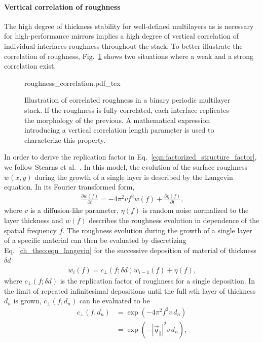 \paragraph{Vertical correlation of roughness}
The high degree of thickness stability for well-defined multilayers as is necessary for high-performance mirrors implies a high degree of vertical correlation of individual interfaces roughness throughout the stack. To better illustrate the correlation of roughness, Fig.~\ref{ch_theo:fig_vertical_roughness_correlation} shows two situations where a weak and a strong correlation exist.
\begin{figure}[htb]
    \def\svgwidth{\textwidth}
    {roughness_correlation.pdf_tex}
    \caption{Illustration of correlated roughness in a binary periodic multilayer stack. If the roughness is fully correlated, each interface replicates the morphology of the previous. A mathematical expression introducing a vertical correlation length parameter is used to characterize this property.}
    \label{ch_theo:fig_vertical_roughness_correlation}
\end{figure}
In order to derive the replication factor in Eq.~\eqref{eqn:factorized_structure_factor}, we follow Stearns et al.~\cite{stearns_x-ray_1992}. In this model, the evolution of the surface roughness $w(x,y)$ during the growth of a single layer is described by the Langevin equation. In its Fourier transformed form, 
\begin{align}
\frac{\partial w(f)}{\partial t} = - 4 \pi^2 v f^2 w(f) + \frac{\partial \eta(f)}{\partial t} \text{,} \label{ch_theo:eqn_langevin}
\end{align}
where $v$ is a diffusion-like parameter, $\eta(f)$ is random noise normalized to the layer thickness and $w(f)$ describes the roughness evolution in dependence of the spatial frequency $f$. The roughness evolution during the growth of a single layer of a specific material can then be evaluated by discretizing Eq.~\eqref{ch_theo:eqn_langevin} for the successive deposition of material of thickness $\delta d$
\begin{align}
w_i(f) = c_\perp(f;\delta d) w_{i-1}(f) + \eta(f) \text{,}
\end{align}
where $c_\perp(f;\delta d)$ is the replication factor of roughness for a single deposition. In the limit of repeated infinitesimal depositions until the full $n$th layer of thickness $d_n$ is grown, $c_\perp(f,d_n)$ can be evaluated to be \cite{spiller_multilayer_1993}
\begin{align}
    c_\perp(f,d_n) &= \exp(-4\pi^2 f^2 v \,d_n) \nonumber \\
                   &= \exp(-|\vec{q}_\parallel|^2 v \,d_n)\text{,}
\end{align}
